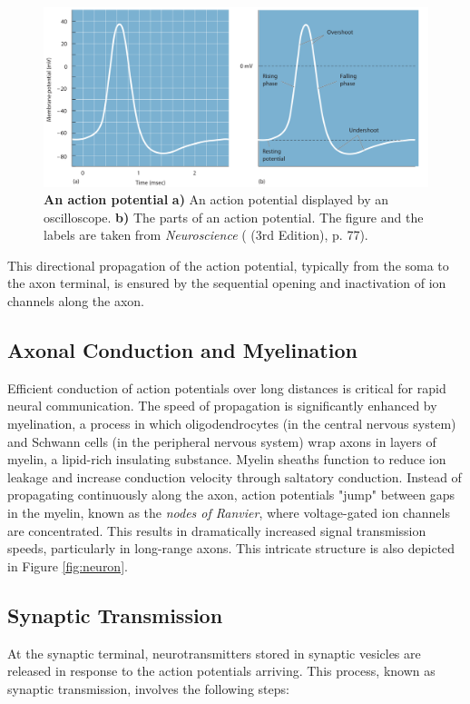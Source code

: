 \begin{figure}
    \centering
    \includegraphics[width=\linewidth]{img/action_potential.pdf}
    \caption{\textbf{An action potential} \textbf{a)} An action potential displayed by an oscilloscope. \textbf{b)} The parts of an action potential. The figure and the labels are taken from \emph{Neuroscience} (\citet{bear2020neuroscience} (3rd Edition), p. 77).}
    \label{fig:action_potential}
\end{figure}

This directional propagation of the action potential, typically from the soma to the axon terminal, is ensured
by the sequential opening and inactivation of ion channels along the axon.

\subsection{Axonal Conduction and Myelination}
\label{subsec:axonal_conduction}
Efficient conduction of action potentials over long distances is critical for
rapid neural communication. The speed of propagation is significantly enhanced by
myelination, a process in which oligodendrocytes (in the central nervous system) 
and Schwann cells (in the peripheral nervous system) wrap axons in layers of myelin, 
a lipid-rich insulating substance. Myelin sheaths function to reduce ion leakage and
increase conduction velocity through saltatory conduction. Instead of propagating
continuously along the axon, action potentials "jump" between gaps in the myelin, 
known as the \emph{nodes of Ranvier}, where voltage-gated ion channels are concentrated. 
This results in dramatically increased signal transmission speeds, particularly
in long-range axons. This intricate structure is also depicted in Figure \ref{fig:neuron}.

\subsection{Synaptic Transmission}
\label{subsec:synaptic_transmission}
At the synaptic terminal, neurotransmitters stored in synaptic vesicles are released
in response to the action potentials arriving. This process, known as synaptic transmission,
involves the following steps:

